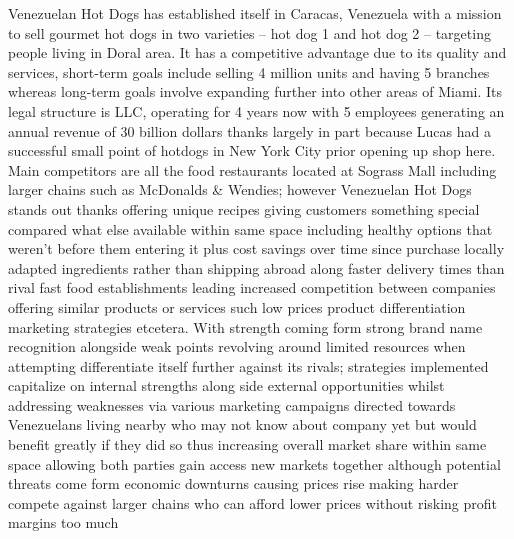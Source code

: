Venezuelan Hot Dogs has established itself in Caracas, Venezuela with a mission to sell gourmet hot dogs in two varieties – hot dog 1 and hot dog 2 – targeting people living in Doral area. It has a competitive advantage due to its quality and services, short-term goals include selling 4 million units and having 5 branches whereas long-term goals involve expanding further into other areas of Miami. Its legal structure is LLC, operating for 4 years now with 5 employees generating an annual revenue of 30 billion dollars thanks largely in part because Lucas had a successful small point of hotdogs in New York City prior opening up shop here. Main competitors are all the food restaurants located at Sograss Mall including larger chains such as McDonalds & Wendies; however Venezuelan Hot Dogs stands out thanks offering unique recipes giving customers something special compared what else available within same space including healthy options that weren’t before them entering it plus cost savings over time since purchase locally adapted ingredients rather than shipping abroad along faster delivery times than rival fast food establishments leading increased competition between companies offering similar products or services such low prices product differentiation marketing strategies etcetera. With strength coming form strong brand name recognition alongside weak points revolving around limited resources when attempting differentiate itself further against its rivals; strategies implemented capitalize on internal strengths along side external opportunities whilst addressing weaknesses via various marketing campaigns directed towards Venezuelans living nearby who may not know about company yet but would benefit greatly if they did so thus increasing overall market share within same space allowing both parties gain access new markets together although potential threats come form economic downturns causing prices rise making harder compete against larger chains who can afford lower prices without risking profit margins too much